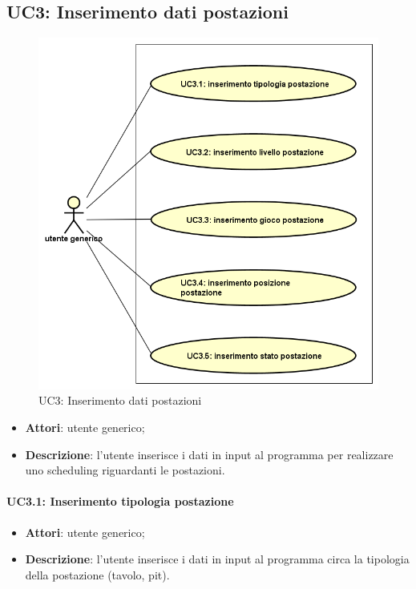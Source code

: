 \subsection{UC3: Inserimento dati postazioni}
\label{UC3}
\begin{figure}[!h]
    \def\svgwidth{\columnwidth}
    \includegraphics[width=\textwidth]{../immagini/usecase/UC3.png}
    \caption{UC3: Inserimento dati postazioni}
\end{figure}
\FloatBarrier
\noindent
\begin{itemize}
    \item \textbf{Attori}: utente generico;
    \item \textbf{Descrizione}: l'utente inserisce i dati in input al programma per realizzare uno scheduling riguardanti le postazioni.
\end{itemize}
\paragraph{UC3.1: Inserimento tipologia postazione}
\begin{itemize}
    \item \textbf{Attori}: utente generico;
    \item \textbf{Descrizione}: l'utente inserisce i dati in input al programma circa la tipologia della postazione (tavolo, pit).
\end{itemize}
